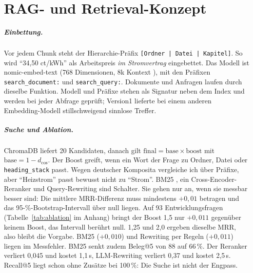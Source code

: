 
\chapter{RAG- und Retrieval-Konzept}
\label{chap:retrieval}

\paragraph{Einbettung.} Vor jedem Chunk steht der Hierarchie-Präfix \texttt{[Ordner | Datei | Kapitel]}. So wird \enquote{34,50 ct/kWh} als Arbeitspreis \emph{im Stromvertrag} eingebettet. Das Modell ist nomic-embed-text (768 Dimensionen, 8k Kontext \cite{nussbaum2024}), mit den Präfixen \texttt{search\_document:} und \texttt{search\_query:}. Dokumente und Anfragen laufen durch dieselbe Funktion. Modell und Präfixe stehen als Signatur neben dem Index und werden bei jeder Abfrage geprüft; Version1 lieferte bei einem anderen Embedding-Modell stillschweigend sinnlose Treffer.

\paragraph{Suche und Ablation.} ChromaDB liefert 20 Kandidaten, danach gilt $\text{final} = \text{base} \times \text{boost}$ mit $\text{base} = 1 - d_{\cos}$. Der Boost greift, wenn ein Wort der Frage zu Ordner, Datei oder \texttt{heading\_stack} passt. Wegen deutscher Komposita vergleiche ich über Präfixe, aber \enquote{Heizstrom} passt bewusst nicht zu \enquote{Strom}. \gls{BM25} \cite{robertson2009}, ein Cross-Encoder-Reranker \cite{nogueira2019} und Query-Rewriting sind Schalter. Sie gehen nur an, wenn sie messbar besser sind: Die mittlere \gls{MRR}-Differenz muss mindestens $+0{,}01$ betragen und das 95-\%-Bootstrap-Intervall über null liegen. Auf 93 Entwicklungsfragen (Tabelle~\ref{tab:ablation} im Anhang) bringt der Boost 1,5 nur $+0{,}011$ gegenüber keinem Boost, das Intervall berührt null. 1,25 und 2,0 ergeben dieselbe MRR, also bleibt die Vorgabe. BM25 ($+0{,}010$) und Rewriting per Regeln ($+0{,}011$) liegen im Messfehler. BM25 senkt zudem Beleg@5 von 88 auf 66\,\%. Der Reranker verliert 0,045 und kostet 1,1\,s, LLM-Rewriting verliert 0,37 und kostet 2,5\,s. Recall@5 liegt schon ohne Zusätze bei 100\,\%: Die Suche ist nicht der Engpass.

